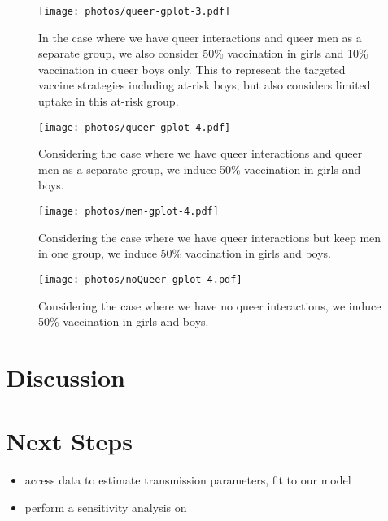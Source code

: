\documentclass[12pt]{article}
\begin{document}

\begin{figure}[h!]
\begin{center}
\texttt{[image: photos/queer-gplot-3.pdf]}
\caption{In the case where we have queer interactions and queer men as a separate group, we also consider 50\% vaccination in girls and 10\% vaccination in queer boys only.  This to represent the targeted vaccine strategies including at-risk boys, but also considers limited uptake in this at-risk group.}
\end{center}
\end{figure}

\begin{figure}[h!]
\begin{center}
\texttt{[image: photos/queer-gplot-4.pdf]}
\caption{Considering the case where we have queer interactions and queer men as a separate group, we induce 50\% vaccination in girls and boys.}
\end{center}
\end{figure}

\begin{figure}[h!]
\begin{center}
\texttt{[image: photos/men-gplot-4.pdf]}
\caption{Considering the case where we have queer interactions but keep men in one group, we induce 50\% vaccination in girls and boys.}
\end{center}
\end{figure}

\begin{figure}[h!]
\begin{center}
\texttt{[image: photos/noQueer-gplot-4.pdf]}
\caption{Considering the case where we have no queer interactions, we induce 50\% vaccination in girls and boys.}
\end{center}
\end{figure}



\section{Discussion}

\section{Next Steps}
\begin{itemize}
\item access data to estimate transmission parameters, fit to our model
\item perform a sensitivity analysis on  
\end{itemize}
\end{document}
